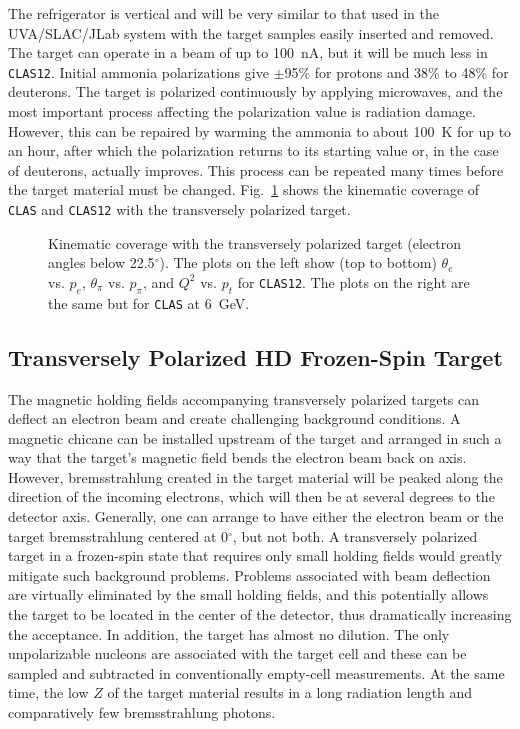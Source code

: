 The refrigerator is vertical and will be very similar to that used in the
UVA/SLAC/JLab system with the target samples easily inserted and removed. The
target can operate in a beam of up to 100~nA, but it will be much less in
{\tt CLAS12}. Initial ammonia polarizations give $\pm$95\% for protons and 
38\% to 48\% for deuterons. The target is polarized continuously by applying
microwaves, and the most important process affecting the polarization value 
is radiation damage.  However, this can be repaired by warming the ammonia 
to about 100~K for up to an hour, after which the polarization returns to its 
starting value or, in the case of deuterons, actually improves. This process 
can be repeated many times before the target material must be changed.
Fig.~\ref{fig:sidistrans} shows the kinematic coverage of {\tt CLAS} and
{\tt CLAS12} with the transversely polarized target.

\begin{figure}
\begin{center}
\vskip-0.2cm
\caption{\small{Kinematic coverage with the transversely polarized target 
(electron angles below 22.5$^\circ$).  The plots on the left show (top
to bottom) $\theta_e$ vs. $p_e$, $\theta_{\pi}$ vs. $p_{\pi}$, and $Q^2$ vs. 
$p_t$ for {\tt CLAS12}.  The plots on the right are the same but for
{\tt CLAS} at 6~GeV.}}
\label{fig:sidistrans}
\end{center}
\end{figure}

\subsection{Transversely Polarized HD Frozen-Spin Target}

The magnetic holding fields accompanying transversely polarized targets can 
deflect an electron beam and create challenging background conditions.  A 
magnetic chicane can be installed upstream of the target and arranged in such 
a way that the target's magnetic field bends the electron beam back on axis. 
However, bremsstrahlung created in the target material will be peaked along 
the direction of the incoming electrons, which will then be at several 
degrees to the detector axis.  Generally, one can arrange to have either the 
electron beam or the target bremsstrahlung centered at 0$^\circ$, but not 
both.  A transversely polarized target in a frozen-spin state that requires 
only small holding fields would greatly mitigate such background problems. 
Problems associated with beam deflection are virtually eliminated by the 
small holding fields, and this potentially allows the target to be located in 
the center of the detector, thus dramatically increasing the acceptance.  In 
addition, the target has almost no dilution. The only unpolarizable nucleons 
are associated with the target cell and these can be sampled and subtracted 
in conventionally empty-cell measurements.  At the same time, the low $Z$
of the target material results in a long radiation length and comparatively 
few bremsstrahlung photons. 

